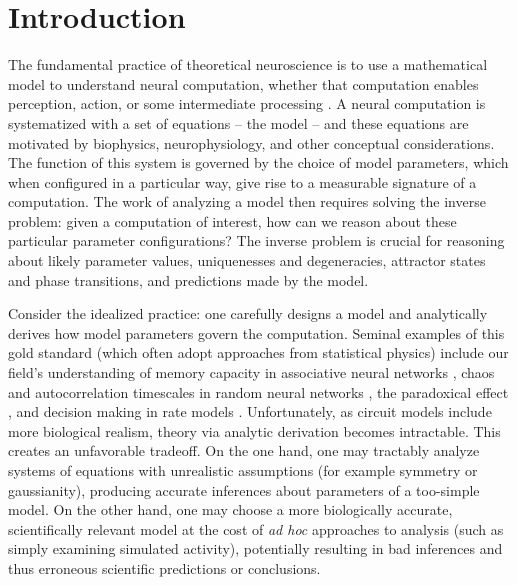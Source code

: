 \documentclass[11pt]{article}
\begin{document}
\section{Introduction}
The fundamental practice of theoretical neuroscience is to use a mathematical model to understand neural computation, whether that computation enables perception, action, or some intermediate processing \cite{abbott2008theoretical}.  
A neural computation is systematized with a set of equations -- the model -- and these equations are motivated by biophysics, neurophysiology, and other conceptual considerations.
The function of this system is governed by the choice of model parameters, which when configured in a particular way, give rise to a measurable signature of a computation.   
The work of analyzing a model then requires solving the inverse problem: given a computation of interest, how can we reason about these particular parameter configurations?  
The inverse problem is crucial for reasoning about likely parameter values, uniquenesses and degeneracies, attractor states and phase transitions, and predictions made by the model.  

Consider the idealized practice: one carefully designs a model and analytically derives how model parameters govern the computation.  
Seminal examples of this gold standard (which often adopt approaches from statistical physics) include our field's understanding of memory capacity in associative neural networks \cite{hopfield1982neural}, chaos and autocorrelation timescales in random neural networks \cite{sompolinsky1988chaos}, the paradoxical effect \cite{tsodyks1997paradoxical}, and decision making  in rate models \cite{wong2006recurrent}.
Unfortunately, as circuit models include more biological realism, theory via analytic derivation becomes intractable.  
This creates an unfavorable tradeoff.  On the one hand, one may tractably analyze systems of equations with unrealistic assumptions (for example symmetry or gaussianity), producing accurate inferences about parameters of a too-simple model.  
On the other hand, one may choose a more biologically accurate, scientifically relevant model at the cost of \emph{ad hoc} approaches to analysis (such as simply examining simulated activity), potentially resulting in bad inferences and thus erroneous scientific predictions or conclusions.
\end{document}
